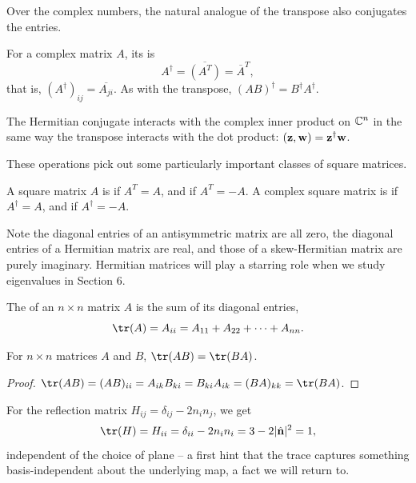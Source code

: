 \documentclass[a4paper]{scrartcl}
\begin{document}
Over the complex numbers, the natural analogue of the transpose also conjugates the entries.

\begin{definition}
	For a complex matrix $A$, its  is
	$$
	A^\dagger = \overline{(A^T)} = \overline{A}^T,
	$$
	that is, $(A^\dagger)_{ij} = \overline{A_{ji}}$. As with the transpose, $(AB)^\dagger = B^\dagger A^\dagger$.
\end{definition}

The Hermitian conjugate interacts with the complex inner product on $\mathbb{C}^n$ in the same way the transpose interacts with the dot product: $(\mathbf{z}, \mathbf{w}) = \mathbf{z}^\dagger \mathbf{w}$.

These operations pick out some particularly important classes of square matrices.

\begin{definition}
	A square matrix $A$ is  if $A^T = A$, and  if $A^T = -A$. A complex square matrix is  if $A^\dagger = A$, and  if $A^\dagger = -A$.
\end{definition}

Note the diagonal entries of an antisymmetric matrix are all zero, the diagonal entries of a Hermitian matrix are real, and those of a skew-Hermitian matrix are purely imaginary. Hermitian matrices will play a starring role when we study eigenvalues in Section 6.

\begin{definition}[Trace]
	The  of an $n \times n$ matrix $A$ is the sum of its diagonal entries,
	$$
	\tr(A) = A_{ii} = A_{11} + A_{22} + \cdots + A_{nn}.
	$$
\end{definition}

\begin{proposition}
	For $n \times n$ matrices $A$ and $B$, $\tr(AB) = \tr(BA)$.
\end{proposition}
\begin{proof}
	$\tr(AB) = (AB)_{ii} = A_{ik}B_{ki} = B_{ki}A_{ik} = (BA)_{kk} = \tr(BA)$.
\end{proof}

\begin{example}
	For the reflection matrix $H_{ij} = \delta_{ij} - 2n_in_j$, we get
	$$
	\tr(H) = H_{ii} = \delta_{ii} - 2 n_i n_i = 3 - 2|\hat{\vv{n}}|^2 = 1,
	$$
	independent of the choice of plane -- a first hint that the trace captures something basis-independent about the underlying map, a fact we will return to.
\end{example}
\end{document}
